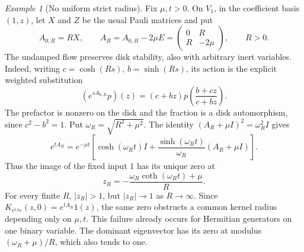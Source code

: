 \documentclass[reqno]{amsart}
\theoremstyle{definition}
\theoremstyle{remark}
\newtheorem{example}[theorem]{Example}
\newcommand{\R}{\mathbb R}
\begin{document}
\begin{example}[No uniform strict radius]\label{spec:no-uniform-radius}
Fix \(\mu,t>0\).  On \(V_1\), in the coefficient basis \((1,z)\),
let \(X\) and \(Z\) be the usual Pauli matrices and put
\[
 A_{0,R}=RX,\qquad
 A_R=A_{0,R}-2\mu E=
 \begin{pmatrix}0&R\\R&-2\mu\end{pmatrix},\qquad R>0.
\]
The undamped flow preserves disk stability, also with arbitrary inert
variables.  Indeed, writing \(c=\cosh(Rs)\), \(b=\sinh(Rs)\),
its action is the explicit weighted substitution
\[
 (e^{sA_{0,R}}p)(z)=(c+bz)
 p\!\left(\frac{b+cz}{c+bz}\right).
\]
The prefactor is nonzero on the disk and the fraction is a disk
automorphism, since \(c^2-b^2=1\).
Put \(\omega_R=\sqrt{R^2+\mu^2}\).  The identity
\((A_R+\mu I)^2=\omega_R^2I\) gives
\[
 e^{tA_R}=e^{-\mu t}\left[
 \cosh(\omega_Rt)I+
 \frac{\sinh(\omega_Rt)}{\omega_R}(A_R+\mu I)\right].
\]
Thus the image of the fixed input \(1\) has its unique zero at
\[
 z_R=-\frac{\omega_R\coth(\omega_Rt)+\mu}{R}.
\]
For every finite \(R\), \(|z_R|>1\), but \(|z_R|\to1\) as
\(R\to\infty\).  Since \(K_{e^{tA_R}}(z,0)=e^{tA_R}1(z)\),
the same zero obstructs a common kernel radius depending only on
\(\mu,t\).  This failure already occurs for Hermitian generators
on one binary variable.  The dominant eigenvector has its zero at
modulus \((\omega_R+\mu)/R\), which also tends to one.
\end{example}
\end{document}
